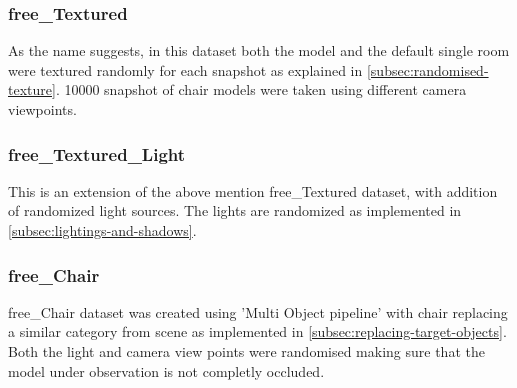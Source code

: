 \subsubsection{\gls{free}\_Textured}

    As the name suggests, in this dataset both the model and the default single room were textured randomly for each snapshot as explained in \autoref{subsec:randomised-texture}.
    10000 snapshot of chair models were taken using different camera viewpoints.

\subsubsection{\gls{free}\_Textured\_Light}

    This is an extension of the above mention \gls{free}\_Textured dataset, with addition of randomized light sources.
    The lights are randomized as implemented in \autoref{subsec:lightings-and-shadows}.

\subsubsection{\gls{free}\_Chair}

    \gls{free}\_Chair dataset was created using 'Multi Object pipeline' with chair replacing a similar category from scene as implemented in \autoref{subsec:replacing-target-objects}.
    Both the light and camera view points were randomised making sure that the model under observation is not completly occluded.


